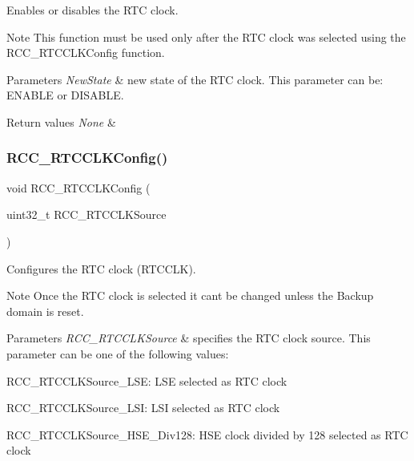 Enables or disables the R\+TC clock. 

\begin{DoxyNote}{Note}
This function must be used only after the R\+TC clock was selected using the R\+C\+C\+\_\+\+R\+T\+C\+C\+L\+K\+Config function. 
\end{DoxyNote}

\begin{DoxyParams}{Parameters}
{\em New\+State} & new state of the R\+TC clock. This parameter can be\+: E\+N\+A\+B\+LE or D\+I\+S\+A\+B\+LE. \\
\hline
\end{DoxyParams}

\begin{DoxyRetVals}{Return values}
{\em None} & \\
\hline
\end{DoxyRetVals}
\mbox{\label{group___r_c_c___private___functions_ga1473d8a5a020642966359611c44181b0}} 
\subsubsection{\texorpdfstring{RCC\_RTCCLKConfig()}{RCC\_RTCCLKConfig()}}
{\footnotesize\ttfamily void R\+C\+C\+\_\+\+R\+T\+C\+C\+L\+K\+Config (\begin{DoxyParamCaption}\item[{uint32\+\_\+t}]{R\+C\+C\+\_\+\+R\+T\+C\+C\+L\+K\+Source }\end{DoxyParamCaption})}



Configures the R\+TC clock (R\+T\+C\+C\+LK). 

\begin{DoxyNote}{Note}
Once the R\+TC clock is selected it can\textquotesingle{}t be changed unless the Backup domain is reset. 
\end{DoxyNote}

\begin{DoxyParams}{Parameters}
{\em R\+C\+C\+\_\+\+R\+T\+C\+C\+L\+K\+Source} & specifies the R\+TC clock source. This parameter can be one of the following values\+: \begin{DoxyItemize}
\item R\+C\+C\+\_\+\+R\+T\+C\+C\+L\+K\+Source\+\_\+\+L\+SE\+: L\+SE selected as R\+TC clock \item R\+C\+C\+\_\+\+R\+T\+C\+C\+L\+K\+Source\+\_\+\+L\+SI\+: L\+SI selected as R\+TC clock \item R\+C\+C\+\_\+\+R\+T\+C\+C\+L\+K\+Source\+\_\+\+H\+S\+E\+\_\+\+Div128\+: H\+SE clock divided by 128 selected as R\+TC clock \end{DoxyItemize}
\\
\hline
\end{DoxyParams}

